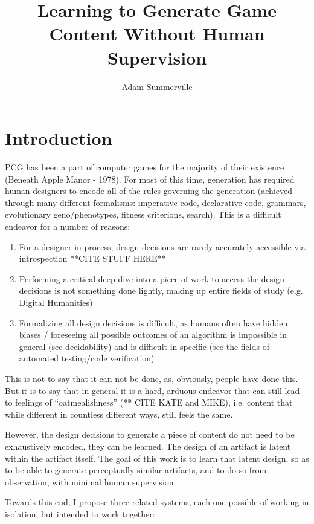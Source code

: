 \documentclass[a4paper]{article}
\title{Learning to Generate Game Content Without Human Supervision }
\author[1]{Adam Summerville}
\begin{document}
\maketitle
\thispagestyle{fancy}

\section{Introduction}

PCG has been a part of computer games for the majority of their existence (Beneath Apple Manor - 1978).  For most of this time, generation has required human designers to encode all of the rules governing the generation (achieved through many different formalisms: imperative code, declarative code, grammars, evolutionary geno/phenotypes, fitness criterions, search).  This is a difficult endeavor for a number of reasons:

\begin{enumerate}
\item For a designer in process, design decisions are rarely accurately accessible via introspection **CITE STUFF HERE**
\item Performing a critical deep dive into a piece of work to access the design decisions is not something done lightly, making up entire fields of study (e.g. Digital Humanities)
\item Formalizing all design decisions is difficult, as humans often have hidden biases / foreseeing all possible outcomes of an algorithm is impossible in general (see decidability) and is difficult in specific (see the fields of automated testing/code verification)
\end{enumerate}

This is not to say that it can not be done, as, obviously, people have done this.  But it is to say that in general it is a hard, arduous endeavor that can still lead to feelings of ``oatmealishness'' (** CITE KATE and MIKE), i.e. content that while different in countless different ways, still feels the same.  

However, the design decisions to generate a piece of content do not need to be exhaustively encoded, they can be learned.  The design of an artifact is latent within the artifact itself.  The goal of this work is to learn that latent design, so as to be able to generate perceptually similar artifacts, and to do so from observation, with minimal human supervision.

Towards this end, I propose three related systems, each one possible of working in isolation, but intended to work together:
\end{document}
